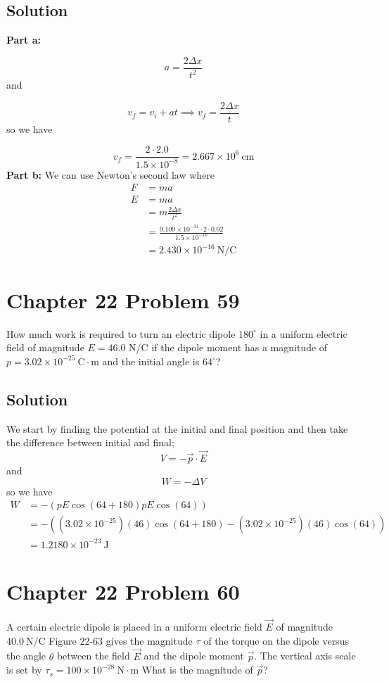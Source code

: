 \documentclass{article}
\newcommand{\m}{\text{m}}
\newcommand{\centi}{\text{c}}
\newcommand{\N}{\text{N}}
\newcommand{\J}{\text{J}}
\newcommand{\C}{\text{C}}
\begin{document}
\subsection*{Solution}
\textbf{Part a:}

\[
	a = \frac{2\Delta x}{t^2}
\]
and

\[
	v_f = v_i + at \implies v_f = \frac{2\Delta x}{t} 
\]
so we have

\[
	v_f = \frac{2\cdot 2.0}{1.5 \times 10^{-8}} = \boxed{2.667 \times 10^6\ \centi\m}
\]
\textbf{Part b:} We can use Newton's second law where
\begin{align*}
	F &= m a \\
	E &= m a \\
	&= m \frac{2\Delta x}{t^2} \\
	&= \frac{9.109 \times 10^{-31} \cdot 2 \cdot 0.02}{1.5 \times 10^{-16}} \\
	&= \boxed{2.430\times10^{-16} \ \N/\C}
\end{align*}

\section*{Chapter 22 Problem 59}
How much work is required to turn an electric dipole $180^\circ$ in a uniform electric field of magnitude $E = 46.0$ N/C if the dipole moment has a magnitude of $p=3.02 \times 10^{-25}\ \C \cdot \m$ and the initial angle is $64^\circ$?

\subsection*{Solution}
We start by finding the potential at the initial and final position and then take the difference between initial and final;
\[
	V = - \vec p \cdot \vec E
\]
and
\[
	W = -\Delta V
\]
so we have
\begin{align*}
	W &= -\left(pE \cos(64+180) pE \cos(64) \right) \\
	  &= -\left(\left(3.02 \times 10^{-25}\right)\left( 46\right) \cos(64+180) - \left(3.02 \times 10^{-25}\right)\left( 46\right) \cos(64) \right) \\ 
	  &= \boxed{1.2180\times10^{-23}\ \J}
\end{align*}

\section*{Chapter 22 Problem 60}
A certain electric dipole is placed in a uniform electric field $\vec E$ of magnitude $40.0\ \N/\C$ Figure 22-63 gives the magnitude $\tau$ of the torque on the dipole versus the angle $\theta$ between the field $\vec E$ and the dipole moment $\vec p$. The vertical axis scale is set by $\tau_s = 100 \times 10^{-28}\ \N \cdot \m $ What is the magnitude of $\vec p$?
\end{document}
